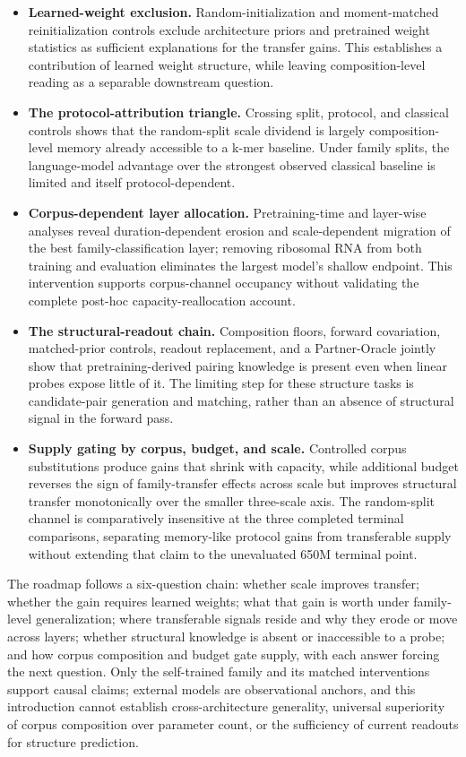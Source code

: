 \begin{itemize}
\tightlist
\item
  \textbf{Learned-weight exclusion.} Random-initialization and moment-matched reinitialization controls exclude architecture priors and pretrained weight statistics as sufficient explanations for the transfer gains. This establishes a contribution of learned weight structure, while leaving composition-level reading as a separable downstream question.
\item
  \textbf{The protocol-attribution triangle.} Crossing split, protocol, and classical controls shows that the random-split scale dividend is largely composition-level memory already accessible to a k-mer baseline. Under family splits, the language-model advantage over the strongest observed classical baseline is limited and itself protocol-dependent.
\item
  \textbf{Corpus-dependent layer allocation.} Pretraining-time and layer-wise analyses reveal duration-dependent erosion and scale-dependent migration of the best family-classification layer; removing ribosomal RNA from both training and evaluation eliminates the largest model's shallow endpoint. This intervention supports corpus-channel occupancy without validating the complete post-hoc capacity-reallocation account.
\item
  \textbf{The structural-readout chain.} Composition floors, forward covariation, matched-prior controls, readout replacement, and a Partner-Oracle jointly show that pretraining-derived pairing knowledge is present even when linear probes expose little of it. The limiting step for these structure tasks is candidate-pair generation and matching, rather than an absence of structural signal in the forward pass.
\item
  \textbf{Supply gating by corpus, budget, and scale.} Controlled corpus substitutions produce gains that shrink with capacity, while additional budget reverses the sign of family-transfer effects across scale but improves structural transfer monotonically over the smaller three-scale axis. The random-split channel is comparatively insensitive at the three completed terminal comparisons, separating memory-like protocol gains from transferable supply without extending that claim to the unevaluated 650M terminal point.
\end{itemize}

The roadmap follows a six-question chain: whether scale improves transfer; whether the gain requires learned weights; what that gain is worth under family-level generalization; where transferable signals reside and why they erode or move across layers; whether structural knowledge is absent or inaccessible to a probe; and how corpus composition and budget gate supply, with each answer forcing the next question. Only the self-trained family and its matched interventions support causal claims; external models are observational anchors, and this introduction cannot establish cross-architecture generality, universal superiority of corpus composition over parameter count, or the sufficiency of current readouts for structure prediction.

